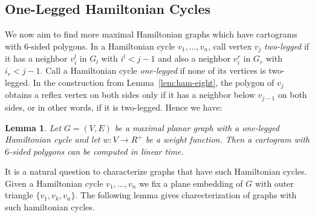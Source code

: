 \documentclass[11pt]{article}
\newtheorem{lemma}{Lemma}[section]
\begin{document}
\subsection{One-Legged Hamiltonian Cycles}

We now aim to find more maximal Hamiltonian graphs which have cartograms with 6-sided polygons.
In a Hamiltonian cycle $v_1, \ldots, v_n$, call vertex
$v_j$ {\em two-legged} if it has a neighbor $v_i^l$ in $G_l$
with $i^l<j-1$ and also a neighbor $v_i^r$ in $G_r$ with $i_r<j-1$.
Call a Hamiltonian cycle {\em one-legged} if none of its vertices
is two-legged.
In the construction from Lemma~\ref{lem:ham-eight}, the polygon of $v_j$
obtains a reflex vertex on both sides only if it has a neighbor below
$v_{j-1}$ on both sides, or in other words, if it is two-legged.
Hence we have:

\begin{lemma}\label{lem:6-sided}
  Let $G=(V,E)$ be a maximal planar graph with a one-legged Hamiltonian
  cycle and let $w:V\rightarrow R^+$ be a weight function. Then a
  cartogram with $6$-sided polygons can be computed in linear time.
\end{lemma}

It is a natural question to characterize graphs that have such
Hamiltonian cycles. Given a Hamiltonian cycle $v_1,\ldots,v_n$ we fix a
plane embedding of $G$ with outer triangle $\{v_1,v_k,v_n\}$.
The following lemma gives charecterization of graphs with such hamiltonian cycles.
\end{document}
